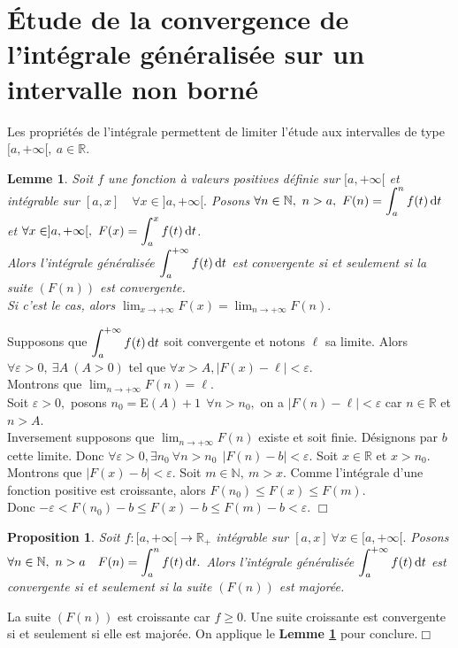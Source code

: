 \documentclass[11pt, a4paper]{book}
\newtheorem{pro}{Proposition}[section]
\newtheorem{lem}{Lemme}[section]
\newenvironment{pr}{\noindent {\bf Preuve} \noindent} {\hfill $\Box$\vskip 5mm}
\begin{document}
\section[Convergence de l'int\'egrale g\'en\'eralis\'ee sur un intervalle non born\'e]{\'Etude de la convergence de l'int\'egrale g\'en\'eralis\'ee sur un intervalle non born\'e}
Les propri\'et\'es de l'int\'egrale permettent de limiter l'\'etude aux intervalles de type $[a,+\infty[,~a\in \mathbb{R}$.
\begin{lem} \label{lem3.2.1} Soit $f$ une fonction \`a valeurs positives d\'efinie sur $[a,+\infty[$ et int\'egrable sur $[a,x]\quad \forall x\in ]a,+\infty[.$ Posons ${\displaystyle \forall n\in \mathbb{N},~n>a,~F(n)=\int_a^n f(t)\,\mathrm{d} t}$ et ${\displaystyle \forall x\in ]a,+\infty[,~F(x)=\int_a^x f(t)\,\mathrm{d} t}$.\\ Alors l'int\'egrale g\'en\'eralis\'ee ${\displaystyle \int_a^{+\infty} f(t)\,\mathrm{d} t}$ est convergente si et seulement si la suite $(F(n))$ est convergente. \\
Si c'est le cas, alors ${\displaystyle \lim_{x\rightarrow+\infty}F(x)=\lim_{n\rightarrow+\infty}F(n).}$ \end{lem}
\begin{pr}\quad
Supposons que ${\displaystyle \int_a^{+\infty}f(t)\,\mathrm{d} t}$ soit convergente et notons $\ell$ sa limite. Alors $\forall \varepsilon >0,~\exists A~(A>0)$ tel que $\forall x>A,|F(x)-\ell|<\varepsilon.$\\
Montrons que ${\displaystyle \lim_{n\rightarrow+\infty}F(n)=\ell}$.\\
Soit $\varepsilon >0,$ posons $n_0=$E$(A)+1~~ \forall n>n_0,$ on a $|F(n)-\ell|<\varepsilon$ car $n\in \mathbb{R}$ et $n>A$. \\
Inversement supposons que ${\displaystyle \lim_{n\rightarrow+\infty}F(n)}$ existe et soit finie. D\'esignons par $b$ cette limite. Donc $\forall \varepsilon >0, \exists n_0 ~\forall n>n_0 ~~|F(n)-b|<\varepsilon.$ Soit $x\in \mathbb{R}$ et $x>n_0$. Montrons que $|F(x)-b|<\varepsilon.$ Soit $m\in \mathbb{N},~m>x.$ Comme l'int\'egrale d'une fonction positive est croissante, alors $F(n_0)\leq F(x) \leq F(m).$\\ Donc $-\varepsilon< F(n_0) -b\leq F(x)-b\leq F(m)-b<\varepsilon.$ 
\end{pr}
\begin{pro} \label{pro3.2.1} Soit $f:[a,+\infty[\longrightarrow \mathbb{R}_+$ int\'egrable sur $[a,x]~\forall x\in [a,+\infty[.$  Posons $\forall n\in \mathbb{N},~n>a~~~{\displaystyle  F(n)=\int_a^n f(t)\,\mathrm{d} t.}$ Alors l'int\'egrale g\'en\'eralis\'ee ${\displaystyle \int_a^{+\infty} f(t)\,\mathrm{d} t}$ est convergente si et seulement si la suite $(F(n))$ est major\'ee. \end{pro}
\begin{pr}\quad
La suite $(F(n))$ est croissante car $f\geq0.$ Une suite croissante est convergente si et seulement si elle est major\'ee. On applique le \textbf{Lemme \ref{lem3.2.1}} pour conclure.\end{pr}
\end{document}
